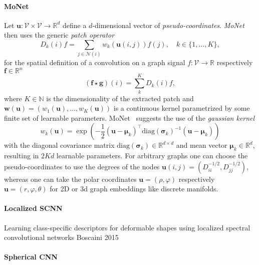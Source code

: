 \documentclass[pdftex,10pt,a4paper]{scrartcl}
\begin{document}
\paragraph{MoNet}

Let $\mathbf{u} \colon \mathcal{V} \times \mathcal{V} \to \mathbb{R}^d$ define a $d$-dimensional vector of \emph{pseudo-coordinates}.
\emph{MoNet}~\cite{Monti2016} then uses the generic \emph{patch operator}
\begin{equation*}
  D_k(i)f = \sum_{j \in \mathcal{N}(i)} w_k(\mathbf{u}(i, j)) f(j), \quad k \in \{ 1, \ldots, K \},
\end{equation*}
for the spatial definition of a convolution on a graph signal $f \colon \mathcal{V} \to \mathbb{R}$ respectively $\mathbf{f} \in \mathbb{R}^n$
\begin{equation*}
  (\mathbf{f} \star \mathbf{g})(i) = \sum_k^K D_k(i)f,
\end{equation*}
where $K \in \mathbb{N}$ is the dimensionality of the extracted patch and $\mathbf{w}(\mathbf{u}) = (w_1(\mathbf{u}), \ldots, w_K(\mathbf{u}))$ is a continuous kernel parametrized by some finite set of learnable parameters.
MoNet~\cite{Monti2016} suggests the use of the \emph{gaussian kernel}
\begin{equation*}
  w_k(\mathbf{u}) = \exp \left(-\frac{1}{2} {(\mathbf{u} - \boldsymbol{\mu}_k)}^{\top} {\mathrm{diag}(\boldsymbol{\sigma}_k)}^{-1} (\mathbf{u} - \boldsymbol{\mu}_k) \right)
\end{equation*}
with the diagonal covariance matrix $\mathrm{diag}(\boldsymbol{\sigma}_k) \in \mathbb{R}^{d \times d}$ and mean vector $\boldsymbol{\mu}_k \in \mathbb{R}^d$, resulting in $2Kd$ learnable parameters.
For arbitrary graphs one can choose the pseudo-coordinates to use the degrees of the nodes $\mathbf{u}(i,j) = \left( D_{ii}^{-1/2}, D_{jj}^{-1/2} \right)$, whereas one can take the polar coordinates $\mathbf{u} = (\rho, \varphi)$ respectively $\mathbf{u} = (r, \varphi, \theta)$ for 2D or 3d graph embeddings like discrete manifolds.

\paragraph{Localized SCNN}

Learning class-specific descriptors for deformable shapes using localized spectral convolutional networks
Boscaini 2015

\paragraph{Spherical CNN}
\end{document}
